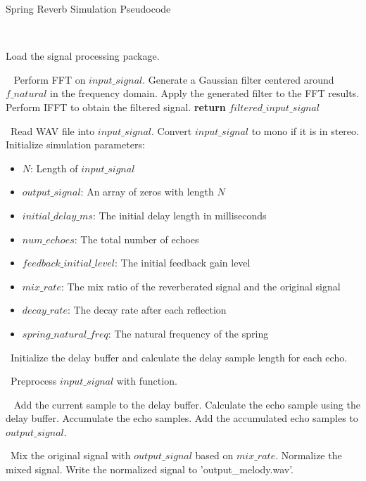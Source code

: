 \documentclass[12pt]{article}
\begin{document}
\begin{algorithm}
\caption{Spring Reverb Simulation Pseudocode}

\
\begin{algorithmic}[1]
\State Load the signal processing package.

\
    \State Perform FFT on $input\_signal$.
    \State Generate a Gaussian filter centered around $f\_natural$ in the frequency domain.
    \State Apply the generated filter to the FFT results.
    \State Perform IFFT to obtain the filtered signal.
    \State \textbf{return} $filtered\_input\_signal$
\EndProcedure

\
\State Read WAV file into $input\_signal$.
\State Convert $input\_signal$ to mono if it is in stereo.
\State Initialize simulation parameters:
\begin{itemize}
    \item $N$: Length of $input\_signal$
    \item $output\_signal$: An array of zeros with length $N$
    \item $initial\_delay\_ms$: The initial delay length in milliseconds
    \item $num\_echoes$: The total number of echoes
    \item $feedback\_initial\_level$: The initial feedback gain level
    \item $mix\_rate$: The mix ratio of the reverberated signal and the original signal
    \item $decay\_rate$: The decay rate after each reflection
    \item $spring\_natural\_freq$: The natural frequency of the spring
\end{itemize}

\
\State Initialize the delay buffer and calculate the delay sample length for each echo.

\
\State Preprocess $input\_signal$ with  function.

\
\For{each sample in $input\_signal$}
    \State Add the current sample to the delay buffer.
        \State Calculate the echo sample using the delay buffer.
        \State Accumulate the echo samples.
    \EndFor
    \State Add the accumulated echo samples to $output\_signal$.
\EndFor

\
\State Mix the original signal with $output\_signal$ based on $mix\_rate$.
\State Normalize the mixed signal.
\State Write the normalized signal to 'output\_melody.wav'.
\end{algorithmic}
\end{algorithm}
\end{document}
